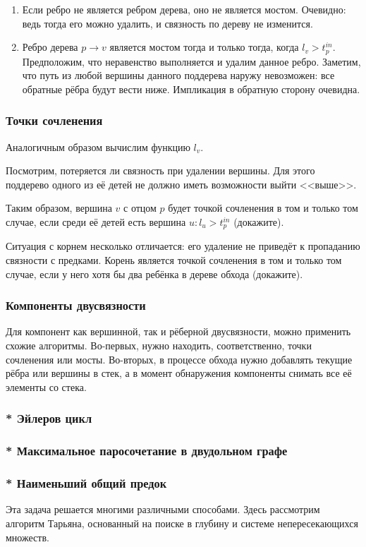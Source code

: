 \documentclass[a4paper,12pt]{article}
\begin{document}
      \begin{enumerate}
        \item Если ребро не является ребром дерева, оно не является
          мостом. Очевидно: ведь тогда его можно удалить, и связность
          по дереву не изменится.
        \item Ребро дерева $p \to v$ является мостом тогда и только
          тогда, когда $l_v > t^{in}_p$. Предположим, что неравенство
          выполняется и удалим данное ребро. Заметим, что путь из
          любой вершины данного поддерева наружу невозможен: все
          обратные рёбра будут вести ниже. Импликация в обратную
          сторону очевидна.
      \end{enumerate}

      \subsubsection{Точки сочленения}

      Аналогичным образом вычислим функцию $l_v$.

      Посмотрим, потеряется ли связность при удалении вершины. Для этого
      поддерево одного из её детей не должно иметь возможности выйти
      <<выше>>.

      Таким образом, вершина $v$ с отцом $p$ будет точкой сочленения
      в том и только том случае, если среди её детей есть вершина
      $u: l_u > t^{in}_p$ (докажите).

      Ситуация с корнем несколько отличается: его удаление не приведёт
      к пропаданию связности с предками. Корень является точкой сочленения
      в том и только том случае, если у него хотя бы два ребёнка в дереве
      обхода (докажите).

      \subsubsection{Компоненты двусвязности}

      Для компонент как вершинной, так и рёберной двусвязности, можно
      применить схожие алгоритмы. Во-первых, нужно находить, соответственно,
      точки сочленения или мосты. Во-вторых, в процессе обхода нужно
      добавлять текущие рёбра или вершины в стек, а в момент обнаружения
      компоненты снимать все её элементы со стека.

      \subsubsection{* Эйлеров цикл}

      \subsubsection{* Максимальное паросочетание в двудольном графе}

      \subsubsection{* Наименьший общий предок}

      Эта задача решается многими различными способами. Здесь рассмотрим
      алгоритм Тарьяна, основанный на поиске в глубину и системе
      непересекающихся множеств.
\end{document}
